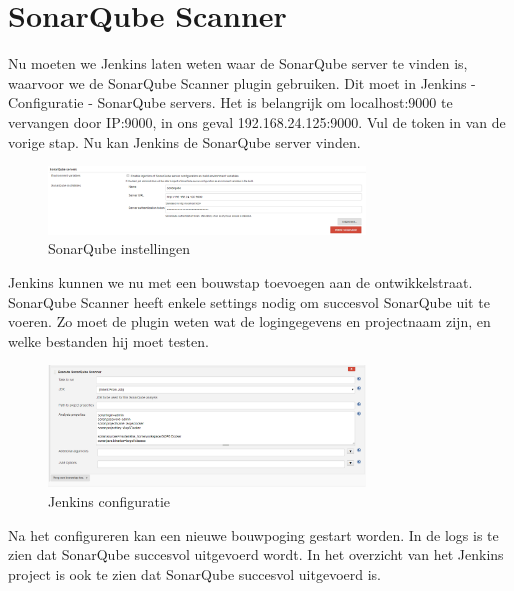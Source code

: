 \documentclass[12pt]{article}
\begin{document}
\section{SonarQube Scanner}
Nu moeten we Jenkins laten weten waar de SonarQube server te vinden is, waarvoor we de SonarQube Scanner plugin gebruiken. Dit moet in Jenkins - Configuratie - SonarQube servers. Het is belangrijk om localhost:9000 te vervangen door IP:9000, in ons geval 192.168.24.125:9000. Vul de token in van de vorige stap. Nu kan Jenkins de SonarQube server vinden.

\begin{figure}[H]
	\begin{center}
		\includegraphics[width=0.75\textwidth]{images/sonarqube_instellen_jenkins.PNG}
		\caption{SonarQube instellingen\label{fig:sonarqube_instellen_jenkins}}
	\end{center}
\end{figure}

Jenkins kunnen we nu met een bouwstap toevoegen aan de ontwikkelstraat. SonarQube Scanner heeft enkele settings nodig om succesvol SonarQube uit te voeren. Zo moet de plugin weten wat de logingegevens en projectnaam zijn, en welke bestanden hij moet testen.

\begin{figure}[H]
	\begin{center}
		\includegraphics[width=0.75\textwidth]{images/jenkins_configuratie.png}
		\caption{Jenkins configuratie\label{fig:jenkins_configuratie}}
	\end{center}
\end{figure}

Na het configureren kan een nieuwe bouwpoging gestart worden. In de logs is te zien dat SonarQube succesvol uitgevoerd wordt. In het overzicht van het Jenkins project is ook te zien dat SonarQube succesvol uitgevoerd is.
\end{document}
